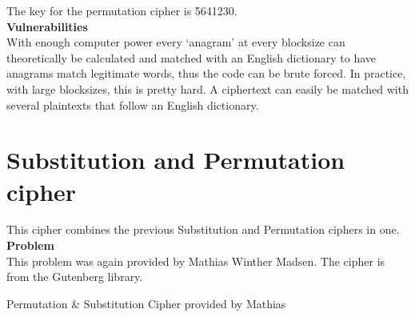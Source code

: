 \documentclass{uva-inf-bachelor-thesis}
\begin{document}
The key for the permutation cipher is 5641230.\\
\newpage
\textbf{Vulnerabilities}\\
With enough computer power every ‘anagram’ at every blocksize can theoretically
be calculated and matched with an English dictionary to have anagrams match
legitimate words, thus the code can be brute forced. In practice, with large
blocksizes, this is pretty hard. A ciphertext can easily be matched with
several plaintexts that follow an English dictionary.
\clearpage

\section{Substitution and Permutation cipher}
This cipher combines the previous Substitution and Permutation ciphers in one.\\

\textbf{Problem}\\
This problem was again provided by Mathias Winther Madsen.
The cipher is from the Gutenberg library.


\caption{Permutation \& Substitution Cipher provided by Mathias}
\end{document}
